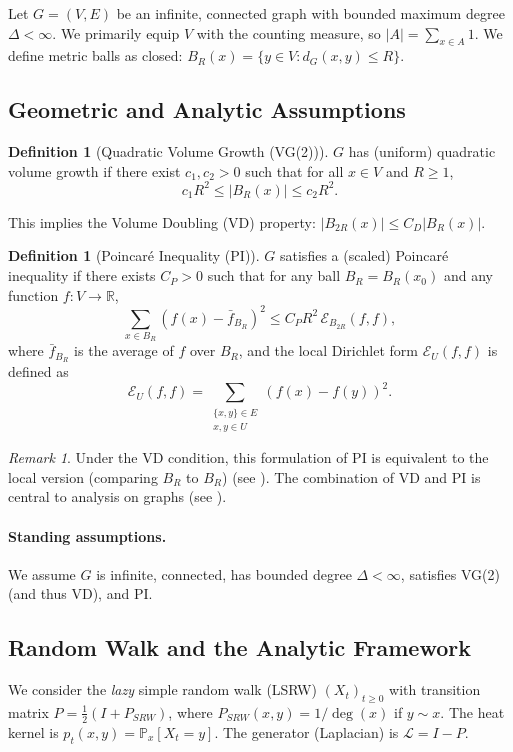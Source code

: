 \documentclass[12pt]{amsart}
\theoremstyle{definition}
\newtheorem{definition}[theorem]{Definition}
\theoremstyle{remark}
\newtheorem{remark}[theorem]{Remark}
\newcommand{\cE}{\mathcal{E}} %
\newcommand{\LL}{\mathcal{L}} %
\newcommand{\R}{\mathbb{R}}
\newcommand{\Prob}{\mathbb{P}}
\begin{document}
Let $G = (V,E)$ be an infinite, connected graph with bounded maximum degree $\Delta < \infty$. We primarily equip $V$ with the counting measure, so $|A| = \sum_{x \in A} 1$. We define metric balls as closed: $B_R(x) = \{y \in V : d_G(x,y) \leq R\}$.

\subsection{Geometric and Analytic Assumptions}

\begin{definition}[Quadratic Volume Growth (VG(2))]
$G$ has (uniform) quadratic volume growth if there exist $c_1, c_2 > 0$ such that for all $x \in V$ and $R \geq 1$,
\begin{equation}\label{eq:quad}
c_1 R^{2} \leq |B_R(x)| \leq c_2 R^{2}.
\end{equation}
\end{definition}
This implies the Volume Doubling (VD) property: $|B_{2R}(x)| \leq C_D |B_R(x)|$.

\begin{definition}[Poincaré Inequality (PI)]\label{def:PI}
$G$ satisfies a (scaled) Poincaré inequality if there exists $C_P > 0$ such that for any ball $B_R=B_R(x_0)$ and any function $f: V \to \R$,
\[
\sum_{x \in B_R} (f(x) - \bar{f}_{B_R})^2 \leq C_P R^2 \, \cE_{B_{2R}}(f,f),
\]
where $\bar{f}_{B_R}$ is the average of $f$ over $B_R$, and the local Dirichlet form $\cE_U(f,f)$ is defined as
\[
\cE_U(f,f) = \sum_{\substack{\{x,y\} \in E \\ x,y \in U}} (f(x)-f(y))^2.
\]
\end{definition}

\begin{remark}\label{rem:PI_equivalence}
Under the VD condition, this formulation of PI is equivalent to the local version (comparing $B_R$ to $B_R$) (see \cite{HajlaszKoskela00}). The combination of VD and PI is central to analysis on graphs (see \cite{GrigoryanTelcs12}).
\end{remark}

\paragraph{Standing assumptions.} We assume $G$ is infinite, connected, has bounded degree $\Delta < \infty$, satisfies VG(2) (and thus VD), and PI.

\subsection{Random Walk and the Analytic Framework}
We consider the \emph{lazy} simple random walk (LSRW) $(X_t)_{t \geq 0}$ with transition matrix $P = \frac{1}{2}(I + P_{SRW})$, where $P_{SRW}(x,y) = 1/\deg(x)$ if $y \sim x$. The heat kernel is $p_t(x,y) = \Prob_x[X_t = y]$. The generator (Laplacian) is $\LL = I - P$.
\end{document}
